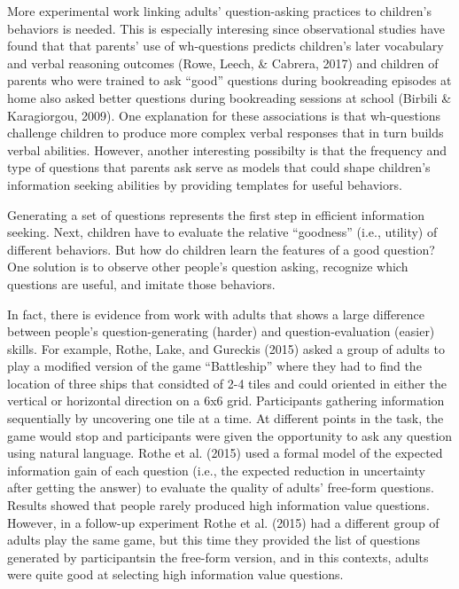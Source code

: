 \documentclass[english,floatsintext,man]{apa6}
\theoremstyle{definition}
\theoremstyle{definition}
\theoremstyle{definition}
\theoremstyle{remark}
\begin{document}
More experimental work linking adults' question-asking practices to
children's behaviors is needed. This is especially interesing since
observational studies have found that that parents' use of wh-questions
predicts children's later vocabulary and verbal reasoning outcomes
(Rowe, Leech, \& Cabrera, 2017) and children of parents who were trained
to ask \enquote{good} questions during bookreading episodes at home also
asked better questions during bookreading sessions at school (Birbili \&
Karagiorgou, 2009). One explanation for these associations is that
wh-questions challenge children to produce more complex verbal responses
that in turn builds verbal abilities. However, another interesting
possibilty is that the frequency and type of questions that parents ask
serve as models that could shape children's information seeking
abilities by providing templates for useful behaviors.

Generating a set of questions represents the first step in efficient
information seeking. Next, children have to evaluate the relative
\enquote{goodness} (i.e., utility) of different behaviors. But how do
children learn the features of a good question? One solution is to
observe other people's question asking, recognize which questions are
useful, and imitate those behaviors.

In fact, there is evidence from work with adults that shows a large
difference between people's question-generating (harder) and
question-evaluation (easier) skills. For example, Rothe, Lake, and
Gureckis (2015) asked a group of adults to play a modified version of
the game \enquote{Battleship} where they had to find the location of
three ships that considted of 2-4 tiles and could oriented in either the
vertical or horizontal direction on a 6x6 grid. Participants gathering
information sequentially by uncovering one tile at a time. At different
points in the task, the game would stop and participants were given the
opportunity to ask any question using natural language. Rothe et al.
(2015) used a formal model of the expected information gain of each
question (i.e., the expected reduction in uncertainty after getting the
answer) to evaluate the quality of adults' free-form questions. Results
showed that people rarely produced high information value questions.
However, in a follow-up experiment Rothe et al. (2015) had a different
group of adults play the same game, but this time they provided the list
of questions generated by participantsin the free-form version, and in
this contexts, adults were quite good at selecting high information
value questions.
\end{document}
